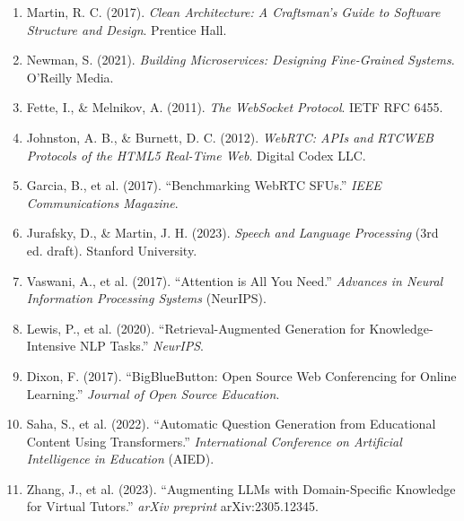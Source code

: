 \begin{english}
\begin{enumerate}
  \item Martin, R. C. (2017). \textit{Clean Architecture: A Craftsman's Guide to
        Software Structure and Design}. Prentice Hall.
  \item Newman, S. (2021). \textit{Building Microservices: Designing Fine-Grained
        Systems}. O'Reilly Media.
  \item Fette, I., \& Melnikov, A. (2011). \textit{The WebSocket Protocol}.
        IETF RFC 6455.
  \item Johnston, A. B., \& Burnett, D. C. (2012). \textit{WebRTC: APIs and RTCWEB
        Protocols of the HTML5 Real-Time Web}. Digital Codex LLC.
  \item Garcia, B., et al. (2017). ``Benchmarking WebRTC SFUs.''
        \textit{IEEE Communications Magazine}.
  \item Jurafsky, D., \& Martin, J. H. (2023). \textit{Speech and Language
        Processing} (3rd ed. draft). Stanford University.
  \item Vaswani, A., et al. (2017). ``Attention is All You Need.''
        \textit{Advances in Neural Information Processing Systems} (NeurIPS).
  \item Lewis, P., et al. (2020). ``Retrieval-Augmented Generation for
        Knowledge-Intensive NLP Tasks.'' \textit{NeurIPS}.
  \item Dixon, F. (2017). ``BigBlueButton: Open Source Web Conferencing for Online
        Learning.'' \textit{Journal of Open Source Education}.
  \item Saha, S., et al. (2022). ``Automatic Question Generation from Educational
        Content Using Transformers.'' \textit{International Conference on
        Artificial Intelligence in Education} (AIED).
  \item Zhang, J., et al. (2023). ``Augmenting LLMs with Domain-Specific Knowledge
        for Virtual Tutors.'' \textit{arXiv preprint} arXiv:2305.12345.
\end{enumerate}
\end{english}
